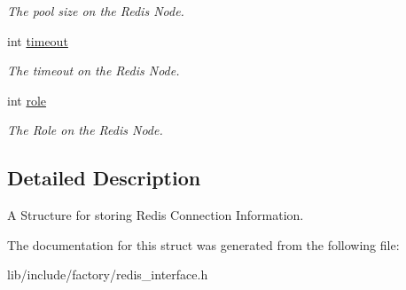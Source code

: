 \begin{DoxyCompactItemize}
\begin{DoxyCompactList}\small\item\em The pool size on the Redis Node. \end{DoxyCompactList}\item 
\hypertarget{structRedisConnChain_aa8503e6bf1350950dda24ad76cd48e24}{int \hyperlink{structRedisConnChain_aa8503e6bf1350950dda24ad76cd48e24}{timeout}}\label{structRedisConnChain_aa8503e6bf1350950dda24ad76cd48e24}

\begin{DoxyCompactList}\small\item\em The timeout on the Redis Node. \end{DoxyCompactList}\item 
\hypertarget{structRedisConnChain_a92766bf2d64183f8e56515302215b4be}{int \hyperlink{structRedisConnChain_a92766bf2d64183f8e56515302215b4be}{role}}\label{structRedisConnChain_a92766bf2d64183f8e56515302215b4be}

\begin{DoxyCompactList}\small\item\em The Role on the Redis Node. \end{DoxyCompactList}\end{DoxyCompactItemize}


\subsection{Detailed Description}
A Structure for storing Redis Connection Information. 

The documentation for this struct was generated from the following file\-:\begin{DoxyCompactItemize}
\item 
lib/include/factory/redis\-\_\-interface.\-h\end{DoxyCompactItemize}
